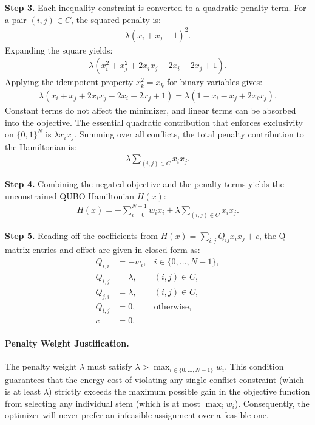 \documentclass[12pt]{article}
\begin{document}
\textbf{Step 3.} Each inequality constraint is converted to a quadratic penalty term. For a pair $(i,j) \in C$, the squared penalty is:
\begin{align}
    \lambda (x_i + x_j - 1)^2.
\end{align}
Expanding the square yields:
\begin{align}
    \lambda (x_i^2 + x_j^2 + 2x_i x_j - 2x_i - 2x_j + 1).
\end{align}
Applying the idempotent property $x_k^2 = x_k$ for binary variables gives:
\begin{align}
    \lambda (x_i + x_j + 2x_i x_j - 2x_i - 2x_j + 1) = \lambda (1 - x_i - x_j + 2x_i x_j).
\end{align}
Constant terms do not affect the minimizer, and linear terms can be absorbed into the objective. The essential quadratic contribution that enforces exclusivity on $\{0,1\}^N$ is $\lambda x_i x_j$. Summing over all conflicts, the total penalty contribution to the Hamiltonian is:
\begin{align}
    \lambda \sum_{(i,j) \in C} x_i x_j.
\end{align}

\textbf{Step 4.} Combining the negated objective and the penalty terms yields the unconstrained QUBO Hamiltonian $H(x)$:
\begin{align}
    H(x) = -\sum_{i=0}^{N-1} w_i x_i + \lambda \sum_{(i,j) \in C} x_i x_j.
\end{align}

\textbf{Step 5.} Reading off the coefficients from $H(x) = \sum_{i,j} Q_{ij} x_i x_j + c$, the Q matrix entries and offset are given in closed form as:
\begin{align}
    Q_{i,i} &= -w_i, & i \in \{0, \dots, N-1\}, \\
    Q_{i,j} &= \lambda, & (i,j) \in C, \\
    Q_{j,i} &= \lambda, & (i,j) \in C, \\
    Q_{i,j} &= 0, & \text{otherwise}, \\
    c &= 0.
\end{align}

\paragraph{Penalty Weight Justification.}
The penalty weight $\lambda$ must satisfy $\lambda > \max_{i \in \{0, \dots, N-1\}} w_i$. This condition guarantees that the energy cost of violating any single conflict constraint (which is at least $\lambda$) strictly exceeds the maximum possible gain in the objective function from selecting any individual stem (which is at most $\max_i w_i$). Consequently, the optimizer will never prefer an infeasible assignment over a feasible one.
\end{document}
